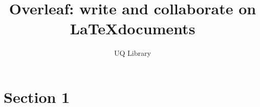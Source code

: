 \documentclass[12 pt]{article}
\title{Overleaf: write and collaborate on \LaTeX documents}
\author{UQ Library}
\begin{document}
\maketitle

\section{Section 1}
\end{document}
